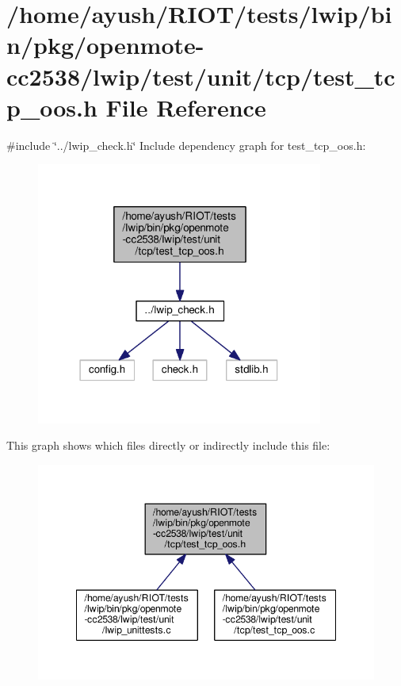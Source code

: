 \hypertarget{openmote-cc2538_2lwip_2test_2unit_2tcp_2test__tcp__oos_8h}{}\section{/home/ayush/\+R\+I\+O\+T/tests/lwip/bin/pkg/openmote-\/cc2538/lwip/test/unit/tcp/test\+\_\+tcp\+\_\+oos.h File Reference}
\label{openmote-cc2538_2lwip_2test_2unit_2tcp_2test__tcp__oos_8h}
{\ttfamily \#include \char`\"{}../lwip\+\_\+check.\+h\char`\"{}}\newline
Include dependency graph for test\+\_\+tcp\+\_\+oos.\+h\+:
\nopagebreak
\begin{figure}[H]
\begin{center}
\leavevmode
\includegraphics[width=267pt]{openmote-cc2538_2lwip_2test_2unit_2tcp_2test__tcp__oos_8h__incl}
\end{center}
\end{figure}
This graph shows which files directly or indirectly include this file\+:
\nopagebreak
\begin{figure}[H]
\begin{center}
\leavevmode
\includegraphics[width=348pt]{openmote-cc2538_2lwip_2test_2unit_2tcp_2test__tcp__oos_8h__dep__incl}
\end{center}
\end{figure}
